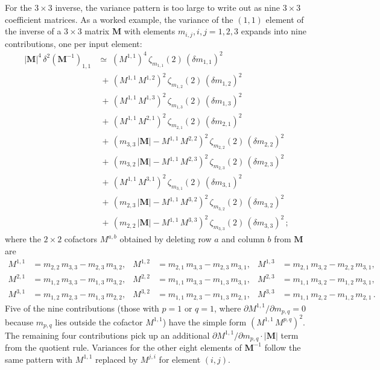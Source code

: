 \documentclass[twoside]{article}
\numberwithin{equation}{section}
\begin{document}
For the $3 \times 3$ inverse, the variance pattern is too large to write out as nine $3 \times 3$ coefficient matrices.  As a worked example, the variance of the $(1,1)$ element of the inverse of a $3 \times 3$ matrix $\mathbf{M}$ with elements $m_{i,j}, i,j = 1, 2, 3$ expands into nine contributions, one per input element:
\begin{align}
|\mathbf{M}|^4\, \delta^2 (\mathbf{M}^{-1})_{1,1} &\simeq\;
	(M^{1,1})^4\, \zeta_{m_{1,1}}(2)\, (\delta m_{1,1})^2 \nonumber \\
&\; +\, (M^{1,1}\, M^{1,2})^2\, \zeta_{m_{1,2}}(2)\, (\delta m_{1,2})^2 \nonumber \\
&\; +\, (M^{1,1}\, M^{1,3})^2\, \zeta_{m_{1,3}}(2)\, (\delta m_{1,3})^2 \nonumber \\
&\; +\, (M^{1,1}\, M^{2,1})^2\, \zeta_{m_{2,1}}(2)\, (\delta m_{2,1})^2 \nonumber \\
&\; +\, (m_{3,3}\, |\mathbf{M}| - M^{1,1}\, M^{2,2})^2\, \zeta_{m_{2,2}}(2)\, (\delta m_{2,2})^2 \nonumber \\
&\; +\, (m_{3,2}\, |\mathbf{M}| - M^{1,1}\, M^{2,3})^2\, \zeta_{m_{2,3}}(2)\, (\delta m_{2,3})^2 \nonumber \\
&\; +\, (M^{1,1}\, M^{3,1})^2\, \zeta_{m_{3,1}}(2)\, (\delta m_{3,1})^2 \nonumber \\
&\; +\, (m_{2,3}\, |\mathbf{M}| - M^{1,1}\, M^{3,2})^2\, \zeta_{m_{3,2}}(2)\, (\delta m_{3,2})^2 \nonumber \\
&\; +\, (m_{2,2}\, |\mathbf{M}| - M^{1,1}\, M^{3,3})^2\, \zeta_{m_{3,3}}(2)\, (\delta m_{3,3})^2 \,;
\label{eqn: inverse matrix 3 11 variance}
\end{align}
where the $2 \times 2$ cofactors $M^{a,b}$ obtained by deleting row $a$ and column $b$ from $\mathbf{M}$ are
\begin{align*}
M^{1,1} &= m_{2,2}\, m_{3,3} - m_{2,3}\, m_{3,2}, &
M^{1,2} &= m_{2,1}\, m_{3,3} - m_{2,3}\, m_{3,1}, &
M^{1,3} &= m_{2,1}\, m_{3,2} - m_{2,2}\, m_{3,1}, \\
M^{2,1} &= m_{1,2}\, m_{3,3} - m_{1,3}\, m_{3,2}, &
M^{2,2} &= m_{1,1}\, m_{3,3} - m_{1,3}\, m_{3,1}, &
M^{2,3} &= m_{1,1}\, m_{3,2} - m_{1,2}\, m_{3,1}, \\
M^{3,1} &= m_{1,2}\, m_{2,3} - m_{1,3}\, m_{2,2}, &
M^{3,2} &= m_{1,1}\, m_{2,3} - m_{1,3}\, m_{2,1}, &
M^{3,3} &= m_{1,1}\, m_{2,2} - m_{1,2}\, m_{2,1} \,.
\end{align*}
Five of the nine contributions (those with $p = 1$ or $q = 1$, where $\partial M^{1,1}/\partial m_{p,q} = 0$ because $m_{p,q}$ lies outside the cofactor $M^{1,1}$) have the simple form $(M^{1,1}\, M^{p,q})^2$.  The remaining four contributions pick up an additional $\partial M^{1,1}/\partial m_{p,q} \cdot |\mathbf{M}|$ term from the quotient rule.  Variances for the other eight elements of $\mathbf{M}^{-1}$ follow the same pattern with $M^{1,1}$ replaced by $M^{j,i}$ for element $(i,j)$.
\end{document}
